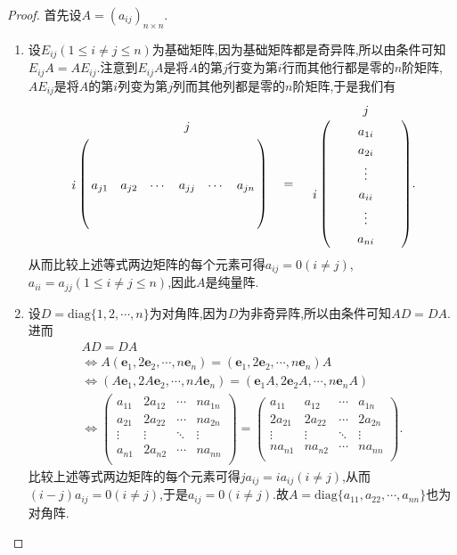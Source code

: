 \documentclass[lang=cn,newtx,10pt,scheme=chinese]{elegantbook}
\begin{document}
\begin{proof}
    首先设$A=(a_{ij})_{n\times n}$.
\begin{enumerate}
\item 设\(E_{ij}(1\leq i\neq j\leq n)\)为基础矩阵,因为基础矩阵都是奇异阵,所以由条件可知\(E_{ij}A = AE_{ij}\).注意到\(E_{ij}A\)是将\(A\)的第\(j\)行变为第\(i\)行而其他行都是零的\(n\)阶矩阵,\(AE_{ij}\)是将\(A\)的第\(i\)列变为第\(j\)列而其他列都是零的\(n\)阶矩阵,于是我们有
    \begin{align*}
        \bordermatrix{%
        &    &		&		&		j&		&
        \cr
        &    &		&		&		&		&		\cr
        &   &		&		&		&		&		\cr
        i&    a_{j1}&		a_{j2}&		\cdots&		a_{jj}&		\cdots&		a_{jn}
            \cr
        &    &		&		&		&		&		\cr
        &    &		&		&		&		&		\cr
        } \quad= \quad \bordermatrix{%
        &    &       &             j&     &
            \cr
        &    &		&		a_{1i}&		&		\cr
        &    &		&		a_{2i}&		&		\cr
        &    &		&		\vdots&		&		\cr
        i&    &		&		a_{ii}&		&		\cr
        &    &		&		\vdots&		&		\cr
        &    &		&		a_{ni}&		&		\cr
        }.
    \end{align*}
从而比较上述等式两边矩阵的每个元素可得\(a_{ij}=0(i\neq j)\),\(a_{ii}=a_{jj}(1\leq i\neq j\leq n)\),因此\(A\)是纯量阵.

\item 设\(D=\text{diag}\{1,2,\cdots,n\}\)为对角阵,因为$D$为非奇异阵,所以由条件可知\(AD = DA\).进而
    \begin{gather*}
        AD=DA
\\
\Leftrightarrow A\left( \boldsymbol{e}_1,2\boldsymbol{e}_2,\cdots ,n\boldsymbol{e}_n \right) =\left( \boldsymbol{e}_1,2\boldsymbol{e}_2,\cdots ,n\boldsymbol{e}_n \right) A
\\
\Leftrightarrow \left( A\boldsymbol{e}_1,2A\boldsymbol{e}_2,\cdots ,nA\boldsymbol{e}_n \right) =\left( \boldsymbol{e}_1A,2\boldsymbol{e}_2A,\cdots ,n\boldsymbol{e}_nA \right) 
\\
\Leftrightarrow \left( \begin{matrix}
	a_{11}&		2a_{12}&		\cdots&		na_{1n}\\
	a_{21}&		2a_{22}&		\cdots&		na_{2n}\\
	\vdots&		\vdots&		\ddots&		\vdots\\
	a_{n1}&		2a_{n2}&		\cdots&		na_{nn}\\
\end{matrix} \right) =\left( \begin{matrix}
	a_{11}&		a_{12}&		\cdots&		a_{1n}\\
	2a_{21}&		2a_{22}&		\cdots&		2a_{2n}\\
	\vdots&		\vdots&		\ddots&		\vdots\\
	na_{n1}&		na_{n2}&		\cdots&		na_{nn}\\
\end{matrix} \right).
    \end{gather*}
比较上述等式两边矩阵的每个元素可得$ja_{ij}=ia_{ij}\left( i\ne j \right)$,从而$\left( i-j \right) a_{ij}=0\left( i\ne j \right)$,于是$a_{ij}=0\left( i\ne j \right) $.故\(A=\text{diag}\{a_{11},a_{22},\cdots,a_{nn}\}\)也为对角阵.


\end{enumerate}
\end{proof}
\end{document}
